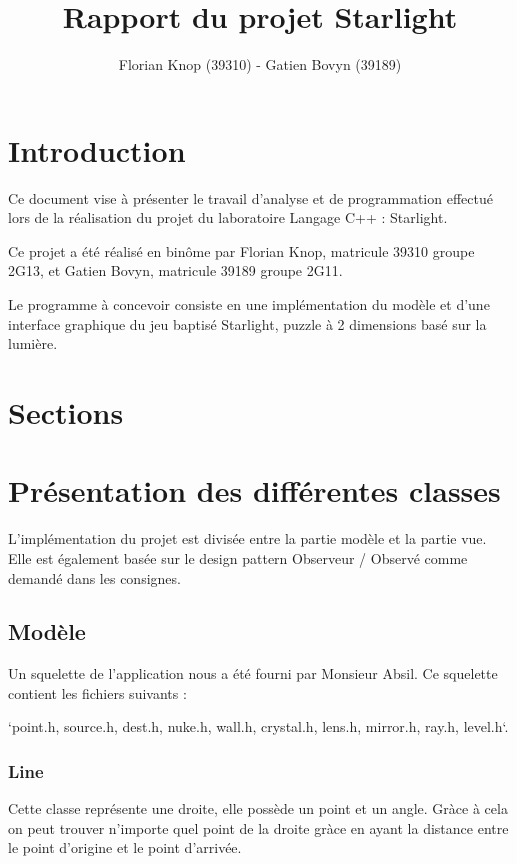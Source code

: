 \documentclass[]{article}
\title{Rapport du projet Starlight}
\author{Florian Knop (39310) - Gatien Bovyn (39189)}
\begin{document}
\maketitle

\newpage

\tableofcontents

\newpage

\section{Introduction}


Ce document vise à présenter le travail d’analyse et de programmation effectué
lors de la réalisation du projet du laboratoire Langage C++ : Starlight.

Ce projet a été réalisé en binôme par Florian Knop, matricule 39310 groupe 2G13,
et Gatien Bovyn, matricule 39189 groupe 2G11.

Le programme à concevoir consiste en une implémentation du modèle et d’une interface
graphique du jeu baptisé Starlight, puzzle à 2 dimensions basé sur la lumière.


\section{Sections}

\section{Présentation des différentes classes}


L’implémentation du projet est divisée entre la partie modèle et la partie vue.
Elle est également basée sur le design pattern  Observeur / Observé  comme demandé
dans les consignes.

\subsection{Modèle}


Un squelette de l’application nous a été fourni par Monsieur Absil. Ce squelette contient les fichiers suivants :

`point.h, source.h, dest.h, nuke.h, wall.h, crystal.h, lens.h, mirror.h, ray.h, level.h`.

\subsubsection{Line}


Cette classe représente une droite, elle possède un point et un
angle. Gràce à cela on peut trouver n'importe quel point de la 
droite gràce en ayant la distance entre le point d'origine
et le point d'arrivée.
\end{document}
